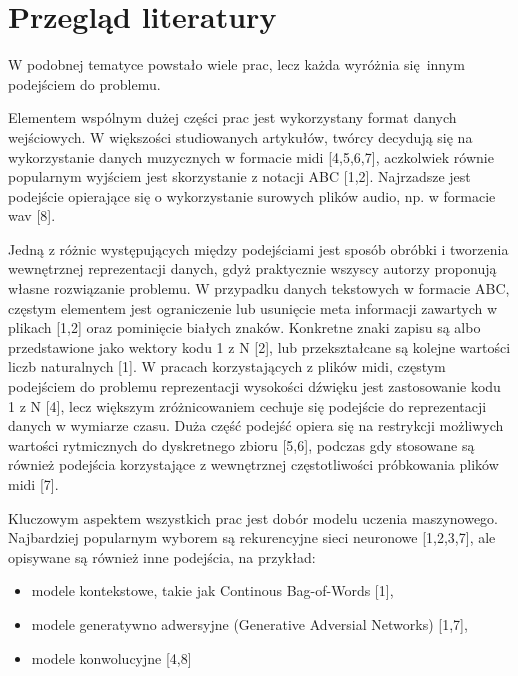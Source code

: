 {  \section{Przegląd literatury}
  {
    W podobnej tematyce powstało wiele prac, lecz każda wyróżnia 
    się innym podejściem do problemu.

    Elementem wspólnym dużej części prac jest wykorzystany format danych wejściowych.
    W większości studiowanych artykułów, twórcy decydują się na wykorzystanie 
    danych muzycznych w formacie midi [4,5,6,7], aczkolwiek równie popularnym wyjściem
    jest skorzystanie z notacji ABC [1,2]. Najrzadsze jest podejście opierające się o
    wykorzystanie surowych plików audio, np. w formacie wav [8].
    
    Jedną z różnic występujących między podejściami jest sposób obróbki i tworzenia
    wewnętrznej reprezentacji danych, gdyż praktycznie wszyscy autorzy 
    proponują własne rozwiązanie problemu. 
    W przypadku danych tekstowych w formacie ABC, częstym elementem jest ograniczenie
    lub usunięcie meta informacji zawartych w plikach [1,2] oraz pominięcie białych znaków.
    Konkretne znaki zapisu są albo przedstawione jako wektory kodu 1 z N [2], 
    lub przekształcane są kolejne wartości liczb naturalnych [1].
    W pracach korzystających z plików midi, częstym podejściem do problemu reprezentacji wysokości
    dźwięku jest zastosowanie kodu 1 z N [4], lecz większym zróżnicowaniem cechuje się podejście
    do reprezentacji danych w wymiarze czasu. Duża część podejść opiera się na restrykcji możliwych
    wartości rytmicznych do dyskretnego zbioru [5,6], podczas gdy stosowane są również podejścia
    korzystające z wewnętrznej częstotliwości próbkowania plików midi [7].

    Kluczowym aspektem wszystkich prac jest dobór modelu uczenia maszynowego.
    Najbardziej popularnym wyborem są rekurencyjne sieci neuronowe [1,2,3,7],
    ale opisywane są również inne podejścia, na przykład:
    \begin{itemize}
      \item modele kontekstowe, takie jak Continous Bag-of-Words [1],
      \item modele generatywno adwersyjne (Generative Adversial Networks) [1,7],
      \item modele konwolucyjne [4,8]
    \end{itemize}

}}
